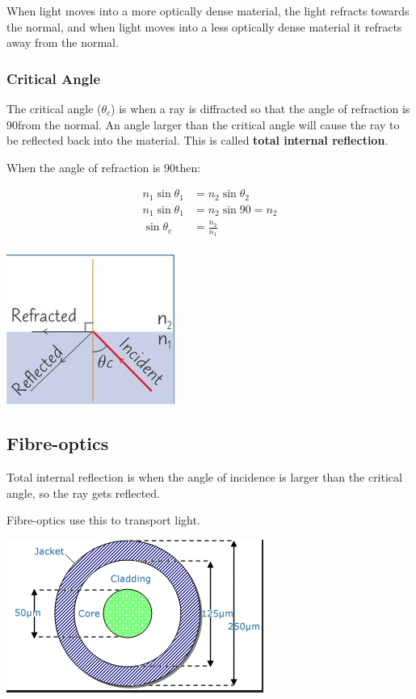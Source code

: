 \documentclass[a4paper, 12pt]{article}
\begin{document}
When light moves into a more optically dense material, the light refracts towards the normal, and when light moves into a less optically dense material it refracts away from the normal.

\subsubsection{Critical Angle}

The critical angle ($\theta_c$) is when a ray is diffracted so that the angle of refraction is 90\textdegree from the normal. An angle larger than the critical angle will cause the ray to be reflected back into the material. This is called \textbf{total internal reflection}.

When the angle of refraction is 90\textdegree then:

\begin{align*}
n_1 \sin{\theta_1} &= n_2 \sin{\theta_2} \\
n_1 \sin{\theta_1} &= n_2 \sin{90} = n_2 \\
\sin{\theta_c} &= \frac{n_2}{n_1} \\
\end{align*}

\begin{center}
\includegraphics[]{images/criticalAngle.png}
\end{center}

\subsection{Fibre-optics}

Total internal reflection is when the angle of incidence is larger than the critical angle, so the ray gets reflected.

Fibre-optics use this to transport light.

\begin{center}
\includegraphics[]{images/opticalFibreCrossSec.png}
\end{center}
\end{document}
